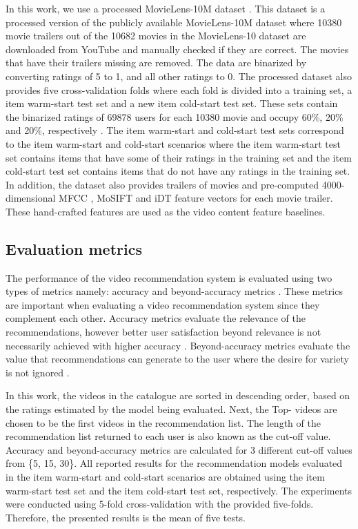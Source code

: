 \documentclass[review]{elsarticle}
\begin{document}
In this work, we use a processed MovieLens-10M dataset \citep{du2018personalized}. This dataset is a processed version of the publicly available MovieLens-10M dataset where 10380 movie trailers out of the 10682 movies in the MovieLens-10 dataset are downloaded from YouTube and manually checked if they are correct. The movies that have their trailers missing are removed. The data are binarized by converting ratings of 5 to 1, and all other ratings to 0. The processed dataset also provides five cross-validation folds where each fold is divided into a training set, a item warm-start test set and a new item cold-start test set. These sets contain the binarized ratings of 69878 users for each 10380 movie and occupy 60\%, 20\% and 20\%, respectively \citep{du2018personalized}. The item warm-start and cold-start test sets correspond to the item warm-start and cold-start scenarios where the item warm-start test set contains items that have some of their ratings in the training set and the item cold-start test set contains items that do not have any ratings in the training set. In addition, the dataset also provides trailers of movies and pre-computed 4000-dimensional \ac{MFCC} \citep{du2018personalized}, \ac{MoSIFT} \citep{chen2009mosift} and \ac{iDT} \citep{wang2013action} feature vectors for each movie trailer. These hand-crafted features are used as the video content feature baselines.




\subsection{Evaluation metrics}
The performance of the video recommendation system is evaluated using two types of metrics namely: accuracy and beyond-accuracy metrics \citep{deldjoo2019movie, shani2011evaluating}. These metrics are important when evaluating a video recommendation system since they complement each other. Accuracy metrics evaluate the relevance of the recommendations, however better user satisfaction beyond relevance is not necessarily achieved with higher accuracy \citep{silveira2019good}. Beyond-accuracy metrics evaluate the value that recommendations can generate to the user where the desire for variety is not ignored \citep{shani2011evaluating}.  

In this work, the videos in the catalogue are sorted in descending order, based on the ratings estimated by the model being evaluated. Next, the Top- videos are chosen to be the first  videos in the recommendation list. The length  of the recommendation list returned to each user is also known as the cut-off value. Accuracy and beyond-accuracy metrics are calculated for 3 different cut-off values from \{5, 15, 30\}.  All reported results for the recommendation models evaluated in the item warm-start and cold-start scenarios are obtained using the item warm-start test set and the item cold-start test set, respectively. The experiments were conducted using 5-fold cross-validation with the provided five-folds. Therefore, the presented results is the mean of five tests.   
\end{document}
